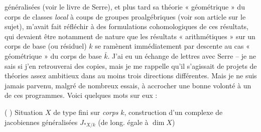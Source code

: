 \documentclass[11pt,a4paper]{article}
\begin{document}
généralisées  (voir le livre de Serre), et plus tard sa théorie « géométrique » du corps de classes \emph{local} à coups de groupes proalgébriques (voir son article sur le sujet), m'avait fait réfléchir à des formulations cohomologiques de ces résultats, qui devaient être notamment de nature  que les résultats « arithmétiques » sur un corps de base (ou résiduel) $k$  se ramènent immédiatement par descente au cas « géométrique » du corps de base $\bar{k}$. J'ai eu un échange de lettres avec Serre -- je ne sais si j'en retrouverai des copies, mais je me rappelle qu'il s'agissait de projets de théories assez ambitieux dans au moins trois directions différentes. Mais je ne suis jamais parvenu, malgré de nombreux essais, à accrocher une bonne volonté à un de ces programmes. Voici quelques mots sur eux :

( ) Situation $X$ de type fini sur \emph{corps} $k$, construction d'un complexe de jacobiennes généralisées $J_{*X/k}$ (de long. égale à $\dim X$)
\end{document}
